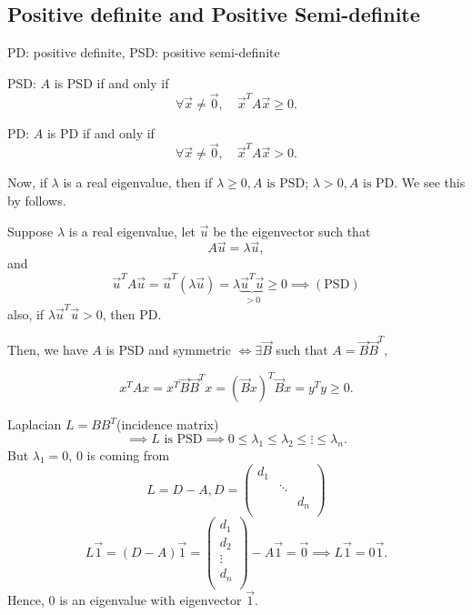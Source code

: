 \subsection{Positive definite and Positive Semi-definite}
\begin{notation}
	PD: positive definite, PSD: positive semi-definite
\end{notation}

\begin{definition}
	PSD: \(A \) is PSD if and only if
	\[
		\forall \vec{x} \neq  \vec{0},\quad \vec{x}^{T}A \vec{x} \geq  0.
	\]
\end{definition}

\begin{definition}
	PD: \(A \) is PD if and only if
	\[
		\forall \vec{x} \neq  \vec{0},\quad \vec{x}^{T}A \vec{x} > 0.
	\]
\end{definition}

Now, if \(\lambda\) is a real eigenvalue, then if \(\lambda \geq  0, A \text{ is PSD}\); \(\lambda > 0, A \text{ is PD}\). We see this
by follows.

Suppose \(\lambda\) is a real eigenvalue, let \(\vec{u}\) be the eigenvector such that
\[
	A \vec{u} = \lambda \vec{u},
\]
and
\[
	\vec{u}^{T} A \vec{u} = \vec{u}^{T} (\lambda \vec{u}) = \lambda \underbrace{\vec{u}^{T}\vec{u}}_{>0} \geq 0\implies(\text{PSD})
\]
also, if \(\lambda \vec{u}^{T} \vec{u} > 0\), then PD.

Then, we have \(A\) is PSD and symmetric \(\iff \exists \vec{B}\) such that \(A = \vec{B} \vec{B}^{T}\),

\[
	x^{T} A x = x^{T} \vec{B} \vec{B}^{T} x = (\vec{B}x)^{T} \vec{B}x = y^{T} y \geq 0.
\]

Laplacian \(L = B B^{T}\)(incidence matrix)
\[
	\implies L \text{ is PSD}\implies 0 \leq \lambda_1 \leq \lambda_2 \leq \vdots \leq \lambda_n.
\]
But \(\lambda_1 = 0\), \(0\) is coming from
\[
	L = D-A, D = \begin{pmatrix}
		d_1 &        &     \\
		    & \ddots &     \\
		    &        & d_n \\
	\end{pmatrix}
\]
\[
	L \vec{1} = (D - A)\vec{1} = \begin{pmatrix}
		d_1    \\
		d_2    \\
		\vdots \\
		d_n    \\
	\end{pmatrix} - A\vec{1} = \vec{0}\implies L \vec{1} = 0 \vec{1}.
\]
Hence, \(0\) is an eigenvalue with eigenvector \(\vec{1}\).

